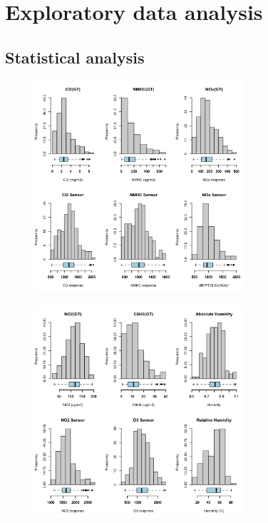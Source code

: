 \section{Exploratory data analysis}

\subsection{Statistical analysis}


\begin{figure}[H]
  \centering
  \includegraphics[width=0.7\textwidth]{figs/summary_1.png}
\end{figure}

\begin{figure}[H]
  \centering
  \includegraphics[width=0.7\textwidth]{figs/summary_2.png}
\end{figure}

